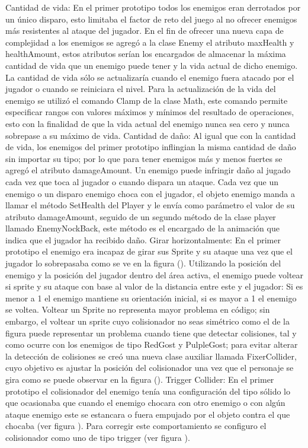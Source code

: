 \begin{itemize}
Cantidad de vida: En el primer prototipo todos los enemigos eran derrotados por un único disparo, esto limitaba el factor de reto del juego al no ofrecer enemigos más resistentes al ataque del jugador. En el fin de ofrecer una nueva capa de complejidad a los enemigos se agregó a la clase Enemy el atributo maxHealth y healthAmount, estos atributos serían los encargados de almacenar la máxima cantidad de vida que un enemigo puede tener y la vida actual de dicho enemigo. La cantidad de vida sólo se actualizaría cuando el enemigo fuera atacado por el jugador o cuando se reiniciara el nivel. Para la actualización de la vida del enemigo se utilizó el comando Clamp de la clase Math, este comando permite especificar rangos con valores máximos y mínimos del resultado de operaciones, esto con la finalidad de que la vida actual del enemigo nunca sea cero y nunca sobrepase a su máximo de vida.
Cantidad de daño: Al igual que con la cantidad de vida, los enemigos del primer prototipo inflingian la misma cantidad de daño sin importar su tipo; por lo que para tener enemigos más y menos fuertes se agregó el atributo damageAmount. Un enemigo puede infringir daño al jugado cada vez que toca al jugador o cuando dispara un ataque. Cada vez que un enemigo o un disparo enemigo choca con el jugador, el objeto enemigo manda a llamar el método SetHealth del Player y le envía como parámetro el valor de su atributo damageAmount, seguido de un segundo método de la clase player llamado EnemyNockBack, este método es el encargado de la animación que indica que el jugador ha recibido daño.
 Girar horizontalmente: En el primer prototipo el enemigo era incapaz de girar sus Sprite y su ataque una vez que el jugador lo sobrepasaba como se ve en la figura (). Utilizando la posición del enemigo y la posición del jugador dentro del área activa, el enemigo puede voltear si sprite y su ataque   con base al valor de la distancia entre este y el jugador: Si es menor a  1 el enemigo mantiene su orientación inicial, si es mayor a 1 el enemigo se voltea. Voltear un Sprite no representa mayor problema en código; sin embargo, el voltear un sprite cuyo colisionador no seas simétrico como el de la figura puede representar un problema cuando tiene que detectar colisiones, tal y como ocurre con los enemigos de tipo RedGost y PulpleGost; para evitar alterar la detección de colisiones se creó una nueva clase auxiliar llamada FixerCollider,  cuyo objetivo es ajustar la posición del colisionador una vez que el personaje se gira como se puede observar en la figura ().
Trigger Collider: En el primer prototipo el colisionador del enemigo tenía una configuración del tipo sólido lo que ocasionaba que cuando el enemigo chocara con otro enemigo o con algún ataque enemigo este se estancara o fuera empujado por el objeto contra el que chocaba (ver figura ). Para corregir este comportamiento se configuro el colisionador como uno de tipo trigger (ver figura ).  

\end{itemize}
